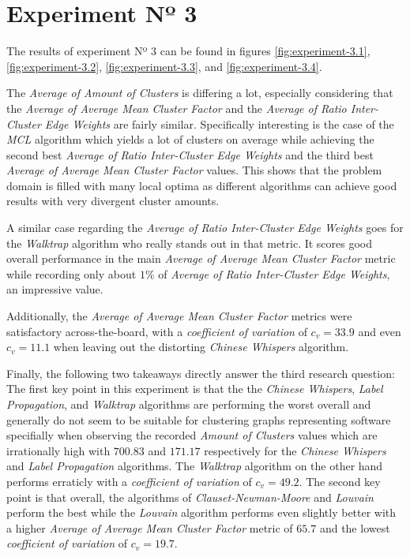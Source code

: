 \documentclass[12pt,a4paper]{report}
\begin{document}
\section{Experiment Nº 3}

The results of experiment Nº 3 can be found in figures
\ref{fig:experiment-3.1}, \ref{fig:experiment-3.2}, \ref{fig:experiment-3.3},
and \ref{fig:experiment-3.4}.

The \textit{Average of Amount of Clusters} is differing a lot, especially considering
that the \textit{Average of Average Mean Cluster Factor} and the
\textit{Average of Ratio Inter-Cluster Edge Weights} are fairly similar.
Specifically interesting is the case of the \textit{MCL} algorithm which yields
a lot of clusters on average while achieving the second best
\textit{Average of Ratio Inter-Cluster Edge Weights} and the third best
\textit{Average of Average Mean Cluster Factor} values.
This shows that the problem domain is filled with many local optima as different
algorithms can achieve good results with very divergent cluster amounts.

A similar case regarding the \textit{Average of Ratio Inter-Cluster Edge Weights}
goes for the \textit{Walktrap} algorithm who really stands out in that metric.
It scores good overall performance in the main
\textit{Average of Average Mean Cluster Factor} metric while recording only about
$1 \%$ of \textit{Average of Ratio Inter-Cluster Edge Weights}, an impressive value.

Additionally, the \textit{Average of Average Mean Cluster Factor} metrics were satisfactory
across\hyp the\hyp board, with a \textit{coefficient of variation}
\cite{everitt2002cambridge} of \(c_v = 33.9\) and even \(c_v = 11.1\) when leaving out
the distorting \textit{Chinese Whispers} algorithm.

Finally, the following two takeaways directly answer the third research question:
The first key point in this experiment is that the the \textit{Chinese Whispers},
\textit{Label Propagation}, and \textit{Walktrap} algorithms are performing the
worst overall and generally do not seem to be suitable for clustering graphs
representing software specifially when observing the recorded
\textit{Amount of Clusters} values which are irrationally
high with $700.83$ and $171.17$ respectively for the \textit{Chinese Whispers} and
\textit{Label Propagation} algorithms. The \textit{Walktrap} algorithm on the other
hand performs erraticly with a \textit{coefficient of variation} of \(c_v = 49.2\).
The second key point is that overall, the algorithms of \textit{Clauset-Newman-Moore}
and \textit{Louvain} perform the best while the \textit{Louvain} algorithm
performs even slightly better with a higher
\textit{Average of Average Mean Cluster Factor} metric of $65.7$ and the lowest
\textit{coefficient of variation} of \(c_v = 19.7\).
\end{document}
